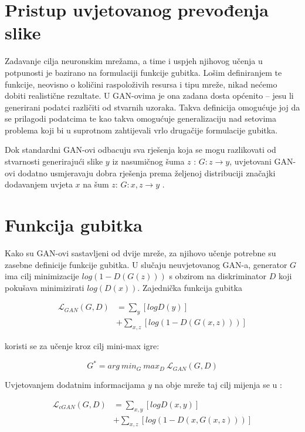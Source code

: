 \documentclass[lmodern, utf8, seminar]{fer}
\newcommand{\Lagr}{\mathcal{L}}
\begin{document}
\section{Pristup uvjetovanog prevođenja slike}
Zadavanje cilja neuronskim mrežama, a time i uspjeh njihovog učenja u potpunosti je bazirano na formulaciji funkcije gubitka. Lošim definiranjem te funkcije, neovisno o količini raspoloživih resursa i tipu mreže, nikad nećemo dobiti realistične rezultate. U GAN-ovima je ona zadana dosta općenito -- jesu li generirani podatci različiti od stvarnih uzoraka. Takva definicija omogućuje joj da se prilagodi podatcima te kao takva omogućuje generalizaciju nad setovima problema koji bi u suprotnom zahtijevali vrlo drugačije formulacije gubitka. 

Dok standardni GAN-ovi odbacuju sva rješenja koja se mogu razlikovati od stvarnosti generirajući slike $y$ iz nasumičnog šuma $z$ : $G: z \rightarrow y$, uvjetovani GAN-ovi dodatno usmjeravaju dobra rješenja prema željenoj distribuciji značajki dodavanjem uvjeta $x$ na šum $z$: $G: {x,z} \rightarrow y$ \cite{isola2017image}.

\newpage
\section{Funkcija gubitka}
Kako su GAN-ovi sastavljeni od dvije mreže, za njihovo učenje potrebne su zasebne definicije funkcije gubitka. U slučaju neuvjetovanog GAN-a, generator $G$ ima cilj minimizacije $log(1 - D(G(z)))$ s obzirom na diskriminator $D$ koji pokušava minimizirati $log(D(x))$.
Zajednička funkcija gubitka

\begin{equation}
\begin{split}
\Lagr_{GAN}(G, D) &= \sum_{y}[log D(y)] \\
			     &+ \sum_{x,z}[log(1 - D(G(x,z)))]
\end{split}
\end{equation}


koristi se za učenje kroz cilj mini-max igre:

\begin{equation}
G^{*} = arg \: min_G \: max_D \: \Lagr_{GAN}(G, D)
\end{equation}

Uvjetovanjem dodatnim informacijama $y$ na obje mreže taj cilj mijenja se u : 

\begin{equation}
\begin{split}
\Lagr_{cGAN}(G, D) &= \sum_{x,y}[log D(x,y)] \\
			       &+ \sum_{x,z}[log(1 - D(x, G(x,z)))]
\end{split}
\end{equation}
\end{document}
